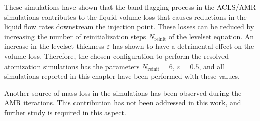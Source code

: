 These simulations have shown that the band flagging process in the ACLS/AMR simulations contributes to the liquid volume loss that causes reductions in the liquid flow rates downstream the injection point. These losses can be reduced by increasing the number of reinitialization steps $N_\mathrm{reinit}$ of the levelset equation. An increase in the levelset thickness $\varepsilon$ has shown to have a detrimental effect on the volume loss. Therefore, the chosen configuration to perform the resolved atomization simulations has the parameters $N_\mathrm{reinit} = 6$, $\varepsilon = 0.5$, and all simulations reported in this chapter have been performed with these values.

Another source of mass loss in the simulations has been observed during the AMR iterations. This contribution has not been addressed in this work, and further study is required in this aspect.



